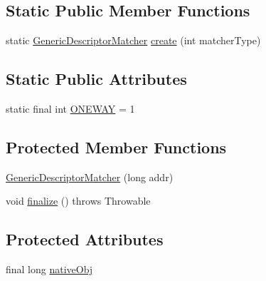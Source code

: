 \subsection*{Static Public Member Functions}
\begin{DoxyCompactItemize}
\item 
static \mbox{\hyperlink{classorg_1_1opencv_1_1features2d_1_1_generic_descriptor_matcher}{Generic\+Descriptor\+Matcher}} \mbox{\hyperlink{classorg_1_1opencv_1_1features2d_1_1_generic_descriptor_matcher_a64b3829be52d49dd4718dda5bef37c2c}{create}} (int matcher\+Type)
\end{DoxyCompactItemize}
\subsection*{Static Public Attributes}
\begin{DoxyCompactItemize}
\item 
static final int \mbox{\hyperlink{classorg_1_1opencv_1_1features2d_1_1_generic_descriptor_matcher_a25d70df2a066237f808035e02f5d1433}{O\+N\+E\+W\+AY}} = 1
\end{DoxyCompactItemize}
\subsection*{Protected Member Functions}
\begin{DoxyCompactItemize}
\item 
\mbox{\hyperlink{classorg_1_1opencv_1_1features2d_1_1_generic_descriptor_matcher_a0a76a002983674ac66ea7419b901231c}{Generic\+Descriptor\+Matcher}} (long addr)
\item 
void \mbox{\hyperlink{classorg_1_1opencv_1_1features2d_1_1_generic_descriptor_matcher_ab777f44ccc3724359edf49ba042c777b}{finalize}} ()  throws Throwable 
\end{DoxyCompactItemize}
\subsection*{Protected Attributes}
\begin{DoxyCompactItemize}
\item 
final long \mbox{\hyperlink{classorg_1_1opencv_1_1features2d_1_1_generic_descriptor_matcher_a8f0f09b5348c9df2c938c54740d7fb8c}{native\+Obj}}
\end{DoxyCompactItemize}


